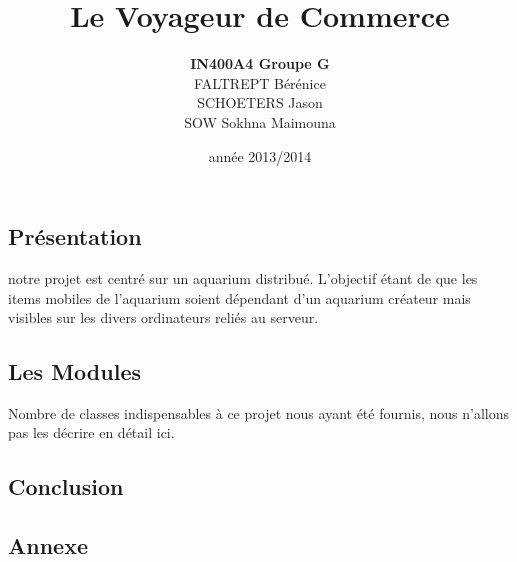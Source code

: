 \documentclass[a4paper, 12pt]{report}
\title{Le Voyageur de Commerce}
\author{\textbf{IN400A4 Groupe G}\\ FALTREPT Bérénice \\ SCHOETERS Jason \\ SOW Sokhna Maimouna}
\date{année 2013/2014}
\begin{document}
	\begin{spacing}{1.3}
\maketitle%
\tableofcontents
\newpage
\textcolor{colortitre1}{\section*{Présentation}} 

notre projet est centré sur un aquarium distribué. L'objectif étant de que les items mobiles de l'aquarium soient dépendant d'un aquarium créateur mais visibles sur les divers ordinateurs reliés au serveur.

\textcolor{colortitre1}{\subsection*{Les Modules}}  

Nombre de classes indispensables à ce projet nous ayant été fournis, nous n'allons pas les décrire en détail ici.

	\textcolor{colortitre2}{\subsection*{}}  

	\textcolor{colortitre2}{\subsection*{}}  	


\textcolor{colortitre1}{\section*{}} 

	\textcolor{colortitre2}{\subsection*{}}    


\textcolor{colortitre1}{\section*{}} 

\textcolor{colortitre1}{\section*{Conclusion}} 

\newpage
\textcolor{colortitre1}{\section*{Annexe}}   

	
	
	
	\end{spacing}
\end{document}
